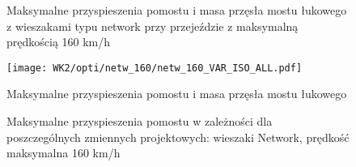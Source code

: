 \begin{figure}[hbt!]
	\centering
	\captionsetup{justification=centering}
	\caption{Maksymalne przyspieszenia pomostu i masa przęsła mostu łukowego z wieszakami typu network przy przejeździe z maksymalną prędkością 160 km/h}
	\label{fig:wk2_opti_netw_160_variables}
\end{figure}
\begin{figure}[hbt!]
	\centering
	\texttt{[image: WK2/opti/netw\_160/netw\_160\_VAR\_ISO\_ALL.pdf]}
	\captionsetup{justification=centering}
	\caption{Maksymalne przyspieszenia pomostu i masa przęsła mostu łukowego }
	\label{fig:wk2_opti_netw_160_vars_all}
\end{figure}
\begin{figure}[hbt!]
	\centering
	\captionsetup{justification=centering}
	\caption{Maksymalne przyspieszenia pomostu w zależności dla poszczególnych zmiennych projektowych: wieszaki Network, prędkość maksymalna 160 km/h}
	\label{fig:wk2_opti_netw_160_var_2d}
\end{figure}
